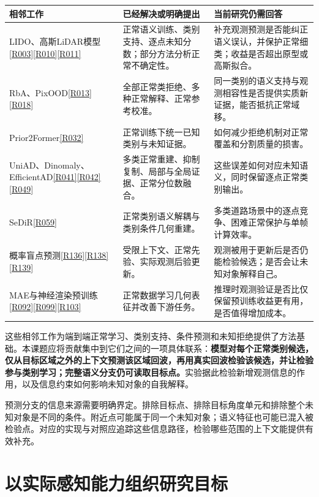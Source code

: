 \documentclass[11pt,a4paper]{article}
\newcommand{\paper}[1]{\allowbreak\hyperlink{#1}{[#1]}\allowbreak}
\begin{document}
\small
\begin{longtable}{>{\raggedright\arraybackslash}p{}>{\raggedright\arraybackslash}p{}>{\raggedright\arraybackslash}p{}}
\toprule
相邻工作 & 已经解决或明确提出 & 当前研究仍需回答 \\
\midrule\endhead
LIDO、高斯LiDAR模型\paper{R003}\paper{R010}\paper{R011} & 正常语义训练、类别支持、逐点未知分数；部分方法分析正常不确定性。 & 补充观测预测是否能纠正语义误认，并保护正常细类；收益是否超出原型或高斯拟合。 \\
RbA、PixOOD\paper{R013}\paper{R018} & 全部正常类拒绝、多种正常解释、正常参考校准。 & 同一类别的语义支持与观测相容性是否提供实质新证据，能否抵抗正常域移。 \\
Prior2Former\paper{R032} & 正常训练下统一已知类别与未知证据。 & 如何减少拒绝机制对正常覆盖和分割质量的损害。 \\
UniAD、Dinomaly、EfficientAD\paper{R041}\paper{R042}\paper{R049} & 多类正常重建、抑制复制、局部与全局证据、正常分位数融合。 & 这些误差如何对应未知语义，同时保留逐点正常类别输出。 \\
SeDiR\paper{R059} & 正常类别语义解耦与类别条件几何重建。 & 多类道路场景中的逐点竞争、困难正常保护与单帧计算效率。 \\
概率盲点预测\paper{R136}\paper{R138}\paper{R139} & 受限上下文、正常先验、实际观测后验更新。 & 观测被用于更新后是否仍能检验候选；是否会让未知对象解释自己。 \\
MAE与神经渲染预训练\paper{R092}\paper{R099}\paper{R103} & 正常数据学习几何表征并改善下游任务。 & 推理时观测验证是否比仅保留预训练收益更有用，是否值得增加成本。 \\
\bottomrule
\end{longtable}
\normalsize

这些相邻工作为端到端正常学习、类别支持、条件预测和未知拒绝提供了方法基础。本课题应将贡献集中到它们之间的一项具体联系：\textbf{模型对每个正常类别候选，仅从目标区域之外的上下文预测该区域回波，再用真实回波检验该候选，并让检验参与类别学习；完整语义分支仍可读取目标点。}实验据此检验新增观测信息的作用，以及信息约束如何影响未知对象的自我解释。

预测分支的信息来源需要明确界定。排除目标点、排除目标角度单元和排除整个未知对象是不同的条件。附近点可能属于同一个未知对象；语义特征也可能已混入被检验点。对应的实现与对照应追踪这些信息路径，检验哪些范围的上下文能提供有效补充。

\section{以实际感知能力组织研究目标}
\end{document}
